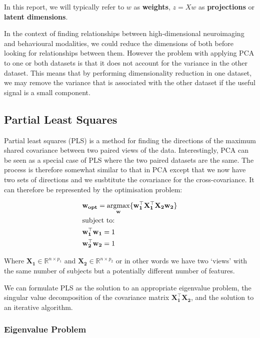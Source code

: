 In this report, we will typically refer to $w$ as \textbf{weights}, $z=Xw$ as \textbf{projections} or \textbf{latent dimensions}.

In the context of finding relationships between high-dimensional neuroimaging and behavioural modalities, we could reduce the dimensions of both before looking for relationships between them. However the problem with applying PCA to one or both datasets is that it does not account for the variance in the other dataset. This means that by performing dimensionality reduction in one dataset, we may remove the variance that is associated with the other dataset if the useful signal is a small component.

\subsection{Partial Least Squares}

Partial least squares (PLS) is a method for finding the directions of the maximum shared covariance between two paired views of the data. Interestingly, PCA can be seen as a special case of PLS where the two paired datasets are the same. The process is therefore somewhat similar to that in PCA except that we now have two sets of directions and we susbtitute the covariance for the cross-covariance. It can therefore be represented by the optimisation problem:

\begin{align}
     & \mathbf{w_{opt}}=\underset{\mathbf{w}}{\mathrm{argmax}}\{ \mathbf{w_1^{\top}X_1^{\top}X_2w_2}  \} \\
     & \text{subject to:} \notag                                                                         \\
     & \mathbf{w_1^{\top}w_1}=1 \notag                                                                   \\
     & \mathbf{w_2^{\top}w_2}=1 \notag
\end{align}

Where $\mathbf{X_1} \in \mathbb{R}^{n \times p_1}$ and $\mathbf{X_2} \in \mathbb{R}^{n \times p_2}$ or in other words we have two `views' with the same number of subjects but a potentially different number of features.

We can formulate PLS as the solution to an appropriate eigenvalue problem, the singular value decomposition of the covariance matrix $\mathbf{X_1^{\top}X_2}$, and the solution to an iterative algorithm.

\subsubsection{Eigenvalue Problem}

